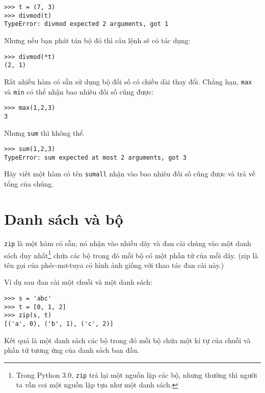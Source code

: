 \documentclass[11pt]{book}
\begin{document}


\beforeverb
\begin{verbatim}
>>> t = (7, 3)
>>> divmod(t)
TypeError: divmod expected 2 arguments, got 1
\end{verbatim}
\afterverb
%
Nhưng nếu bạn phát tán bộ đó thì câu lệnh sẽ có tác dụng:

\beforeverb
\begin{verbatim}
>>> divmod(*t)
(2, 1)
\end{verbatim}
\afterverb
%
\begin{ex}
Rất nhiều hàm có sẵn sử dụng bộ đối số có chiều dài thay đổi.
Chẳng hạn, {\tt max} và {\tt min} có thể nhận bao nhiêu
đối số cũng được:


\beforeverb
\begin{verbatim}
>>> max(1,2,3)
3
\end{verbatim}
\afterverb
%
Nhưng {\tt sum} thì không thể.


\beforeverb
\begin{verbatim}
>>> sum(1,2,3)
TypeError: sum expected at most 2 arguments, got 3
\end{verbatim}
\afterverb
%
Hãy viết một hàm có tên {\tt sumall} nhận vào bao nhiêu đối số cũng được
và trả về tổng của chúng.

\end{ex}


\section{Danh sách và bộ}


{\tt zip} là một hàm có sẵn; nó nhận vào nhiều dãy và đan cài chúng vào
một danh sách duy nhất\footnote{Trong Python 3.0, {\tt zip} trả lại một
  nguồn lặp các bộ, nhưng thường thì người ta vẫn coi một nguồn lặp tựa
  như một danh sách.}  chứa các bộ trong đó mỗi bộ có một phần tử của mỗi
  dãy. (zip là tên gọi của phéc-mơ-tuya có hình ảnh giống
với thao tác đan cài này.)

Ví dụ sau đan cài một chuỗi và một danh sách:

\beforeverb
\begin{verbatim}
>>> s = 'abc'
>>> t = [0, 1, 2]
>>> zip(s, t)
[('a', 0), ('b', 1), ('c', 2)]
\end{verbatim}
\afterverb
%
Kết quả là một danh sách các bộ trong đó mỗi bộ chứa một kí tự của chuỗi
và phần tử tương ứng của danh sách ban đầu.
\end{document}
